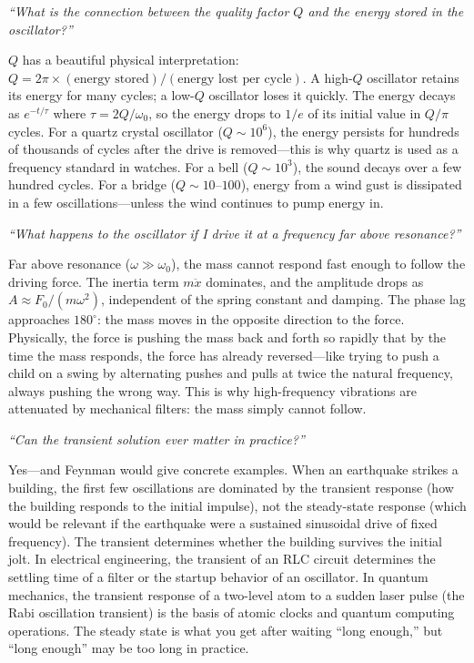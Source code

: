 \textit{``What is the connection between the quality factor $Q$ and the energy stored in the oscillator?''}

$Q$ has a beautiful physical interpretation: $Q = 2\pi \times (\text{energy stored})/(\text{energy lost per cycle})$. A high-$Q$ oscillator retains its energy for many cycles; a low-$Q$ oscillator loses it quickly. The energy decays as $e^{-t/\tau}$ where $\tau = 2Q/\omega_0$, so the energy drops to $1/e$ of its initial value in $Q/\pi$ cycles. For a quartz crystal oscillator ($Q \sim 10^6$), the energy persists for hundreds of thousands of cycles after the drive is removed---this is why quartz is used as a frequency standard in watches. For a bell ($Q \sim 10^3$), the sound decays over a few hundred cycles. For a bridge ($Q \sim 10$--$100$), energy from a wind gust is dissipated in a few oscillations---unless the wind continues to pump energy in.

\textit{``What happens to the oscillator if I drive it at a frequency far above resonance?''}

Far above resonance ($\omega \gg \omega_0$), the mass cannot respond fast enough to follow the driving force. The inertia term $m\ddot{x}$ dominates, and the amplitude drops as $A \approx F_0/(m\omega^2)$, independent of the spring constant and damping. The phase lag approaches $180^\circ$: the mass moves in the opposite direction to the force. Physically, the force is pushing the mass back and forth so rapidly that by the time the mass responds, the force has already reversed---like trying to push a child on a swing by alternating pushes and pulls at twice the natural frequency, always pushing the wrong way. This is why high-frequency vibrations are attenuated by mechanical filters: the mass simply cannot follow.

\textit{``Can the transient solution ever matter in practice?''}

Yes---and Feynman would give concrete examples. When an earthquake strikes a building, the first few oscillations are dominated by the transient response (how the building responds to the initial impulse), not the steady-state response (which would be relevant if the earthquake were a sustained sinusoidal drive of fixed frequency). The transient determines whether the building survives the initial jolt. In electrical engineering, the transient of an RLC circuit determines the settling time of a filter or the startup behavior of an oscillator. In quantum mechanics, the transient response of a two-level atom to a sudden laser pulse (the Rabi oscillation transient) is the basis of atomic clocks and quantum computing operations. The steady state is what you get after waiting ``long enough,'' but ``long enough'' may be too long in practice.


